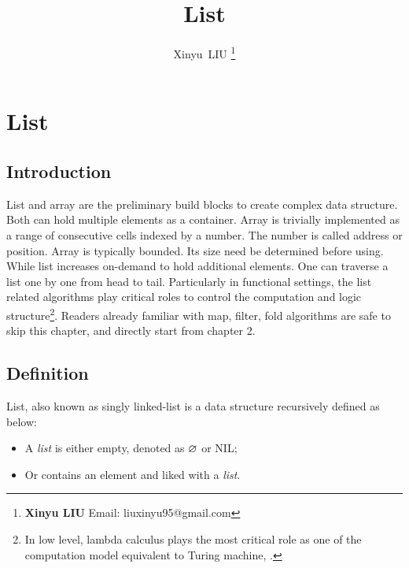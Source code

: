 \documentclass[b5paper]{article}
\begin{document}
\title{List}

\author{Xinyu~LIU
\thanks{{\bfseries Xinyu LIU} \newline
  Email: liuxinyu95@gmail.com \newline}
  }

\maketitle
\fi


\ifx\wholebook\relax
\chapter{List}
\fi

\section{Introduction}
\label{introduction}

List and array are the preliminary build blocks to create complex data structure. Both can hold multiple elements as a container. Array is trivially implemented as a range of consecutive cells indexed by a number. The number is called address or position. Array is typically bounded. Its size need be determined before using. While list increases on-demand to hold additional elements. One can traverse a list one by one from head to tail. Particularly in functional settings, the list related algorithms play critical roles to control the computation and logic structure\footnote{In low level, lambda calculus plays the most critical role as one of the computation model equivalent to Turing machine\cite{mittype}, \cite{unplugged}.}. Readers already familiar with map, filter, fold algorithms are safe to skip this chapter, and directly start from chapter 2.

\section{Definition}

List, also known as singly linked-list is a data structure recursively defined as below:

\begin{itemize}
\item A {\em list} is either empty, denoted as $\varnothing$ or NIL;
\item Or contains an element and liked with a {\em list}.
\end{itemize}
\end{document}

